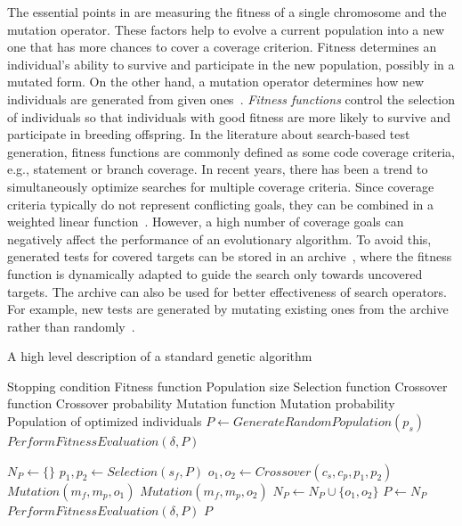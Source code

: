 \documentclass[paper=a4,%
  twoside,%
  BCOR4mm,%
  abstract=true,%
  toc=bibliography,%
  chapterprefix=true,%
  toc=bibliographynumbered,%
  open=right,%
  english,%
  pagesize=pdftex]{scrreprt}
\newcommand{\Desc}[2]{\State \makebox[2em][l]{#1}#2}
\begin{document}
The essential points in  are measuring the fitness of a single chromosome and the mutation operator. These factors help to evolve a current population into a new one that has more chances to cover a coverage criterion. Fitness determines an individual's ability to survive and participate in the new population, possibly in a mutated form. On the other hand, a mutation operator determines how new individuals are generated from given ones~\cite{Tonella2004}. \emph{Fitness functions} control the selection of individuals so that individuals with good fitness are more likely to survive and participate in breeding offspring. In the literature about search-based test generation, fitness functions are commonly defined as some code coverage criteria, e.g., statement or branch coverage. In recent years, there has been a trend to simultaneously optimize searches for multiple coverage criteria. Since coverage criteria typically do not represent conflicting goals, they can be combined in a weighted linear function~\cite{Rojas2015}. However, a high number of coverage goals can negatively affect the performance of an evolutionary algorithm. To avoid this, generated tests for covered targets can be stored in an archive~\cite{Rojas2017}, where the fitness function is dynamically adapted to guide the search only towards uncovered targets. The archive can also be used for better effectiveness of search operators. For example, new tests are generated by mutating existing ones from the archive rather than randomly~\cite{Campos2017}.

\begin{algorithm}
\caption{A high level description of a standard genetic algorithm~\cite{Campos2017}}\label{alg:genetic-algorithm}
\begin{algorithmic}
\Input
  \Desc{$C$}{Stopping condition}
  \Desc{$\delta$}{Fitness function}
  \Desc{$p_s$}{Population size}
  \Desc{$s_f$}{Selection function}
  \Desc{$c_f$}{Crossover function}
  \Desc{$c_p$}{Crossover probability}
  \Desc{$m_f$}{Mutation function}
  \Desc{$m_p$}{Mutation probability}
  \EndInput
  \Output
  \Desc{$P$}{Population of optimized individuals}
  \EndOutput
\State $P \gets GenerateRandomPopulation(p_s)$
\State $PerformFitnessEvaluation(\delta, P)$

    \State $N_P \gets \{\}$
        \State $p_1, p_2 \gets Selection(s_f, P)$
        \State $o_1, o_2 \gets Crossover(c_s, c_p, p_1, p_2)$
        \State $Mutation(m_f, m_p, o_1)$
        \State $Mutation(m_f, m_p, o_2)$
        \State $N_P \gets N_P \cup \{o_1, o_2\}$
    \EndWhile
    \State $P \gets N_P$
    \State $PerformFitnessEvaluation(\delta, P)$
\EndWhile
\State \Return $P$
\end{algorithmic}
\end{algorithm}
\end{document}
